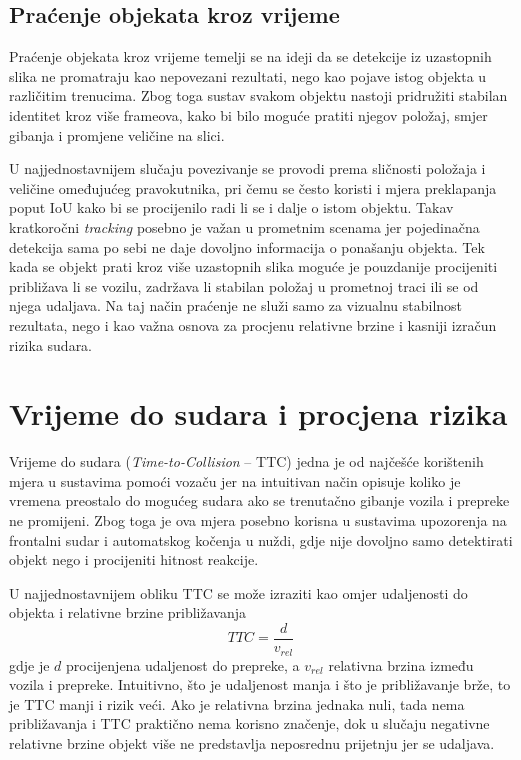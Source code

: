 \subsection{Praćenje objekata kroz vrijeme}
Praćenje objekata kroz vrijeme temelji se na ideji da se detekcije iz uzastopnih slika ne promatraju kao nepovezani rezultati, nego kao pojave istog objekta u različitim trenucima. Zbog toga sustav svakom objektu nastoji pridružiti stabilan identitet kroz više frameova, kako bi bilo moguće pratiti njegov položaj, smjer gibanja i promjene veličine na slici.

U najjednostavnijem slučaju povezivanje se provodi prema sličnosti položaja i veličine omeđujućeg pravokutnika, pri čemu se često koristi i mjera preklapanja poput IoU kako bi se procijenilo radi li se i dalje o istom objektu. Takav kratkoročni \textit{tracking} posebno je važan u prometnim scenama jer pojedinačna detekcija sama po sebi ne daje dovoljno informacija o ponašanju objekta. Tek kada se objekt prati kroz više uzastopnih slika moguće je pouzdanije procijeniti približava li se vozilu, zadržava li stabilan položaj u prometnoj traci ili se od njega udaljava. Na taj način praćenje ne služi samo za vizualnu stabilnost rezultata, nego i kao važna osnova za procjenu relativne brzine i kasniji izračun rizika sudara.

\section{Vrijeme do sudara i procjena rizika}
Vrijeme do sudara (\textit{Time-to-Collision} \--- TTC) jedna je od najčešće korištenih mjera u sustavima pomoći vozaču jer na intuitivan način opisuje koliko je vremena preostalo do mogućeg sudara ako se trenutačno gibanje vozila i prepreke ne promijeni. Zbog toga je ova mjera posebno korisna u sustavima upozorenja na frontalni sudar i automatskog kočenja u nuždi, gdje nije dovoljno samo detektirati objekt nego i procijeniti hitnost reakcije.

U najjednostavnijem obliku TTC se može izraziti kao omjer udaljenosti do objekta i relativne brzine približavanja
\begin{equation}
    TTC = \frac{d}{v_{rel}}
\end{equation}
gdje je $d$ procijenjena udaljenost do prepreke, a $v_{rel}$ relativna brzina između vozila i prepreke. Intuitivno, što je udaljenost manja i što je približavanje brže, to je TTC manji i rizik veći. Ako je relativna brzina jednaka nuli, tada nema približavanja i TTC praktično nema korisno značenje, dok u slučaju negativne relativne brzine objekt više ne predstavlja neposrednu prijetnju jer se udaljava.

